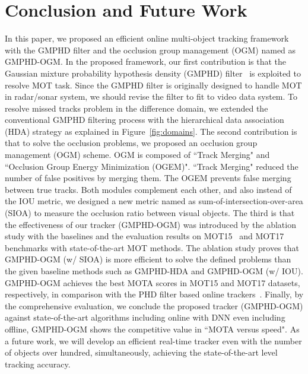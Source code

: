 \documentclass[journal]{IEEEtran}
\newcounter{ct}
\begin{document}
\section{Conclusion and Future Work}
\label{Conclusion}
In this paper, we proposed an efficient online multi-object tracking framework with the GMPHD filter and the occlusion group management (OGM) named as GMPHD-OGM. 
In the proposed framework, our first contribution is that the Gaussian mixture probability hypothesis density (GMPHD) filter~\cite{gmphd} is exploited to resolve MOT task. Since the GMPHD filter is originally designed to handle MOT in radar/sonar system, we should revise the filter to fit to video data system. To resolve missed tracks problem in the difference domain, we extended the conventional GMPHD filtering process with the hierarchical data association (HDA) strategy as explained in Figure~\ref{fig:domains}.
The second contribution is that to solve the occlusion problems, we proposed an occlusion group management (OGM) scheme. OGM is composed of ``Track Merging" and ``Occlusion Group Energy Minimization (OGEM)". ``Track Merging" reduced the number of false positives by merging them. The OGEM prevents false merging between true tracks. Both modules complement each other, and also instead of the IOU metric, we designed a new metric named as sum-of-intersection-over-area (SIOA) to measure the occlusion ratio between visual objects.
The third is that the effectiveness of our tracker (GMPHD-OGM) was introduced by the ablation study with the baselines and the evaluation results on MOT15~\cite{MOT15} and MOT17~\cite{MOT16} benchmarks with state-of-the-art MOT methods. 
The ablation study proves that GMPHD-OGM (w/ SIOA) is more efficient to solve the defined problems than the given baseline methods such as GMPHD-HDA and GMPHD-OGM (w/ IOU).
GMPHD-OGM achieves the best MOTA scores in MOT15 and MOT17 datasets, respectively, in comparison with the PHD filter based online trackers~\cite{fu1, mtdf, prev1, eamtt, gmphdn1tr, gmphdkcf, gmphd2012}.
Finally, by the comprehensive evaluation, we conclude the proposed tracker (GMPHD-OGM) against state-of-the-art algorithms including online with DNN even including offline, GMPHD-OGM shows the competitive value in ``MOTA versus speed".
As a future work, we will develop an efficient real-time tracker even with the number of objects over hundred, simultaneously, achieving the state-of-the-art level tracking accuracy. 
\end{document}
